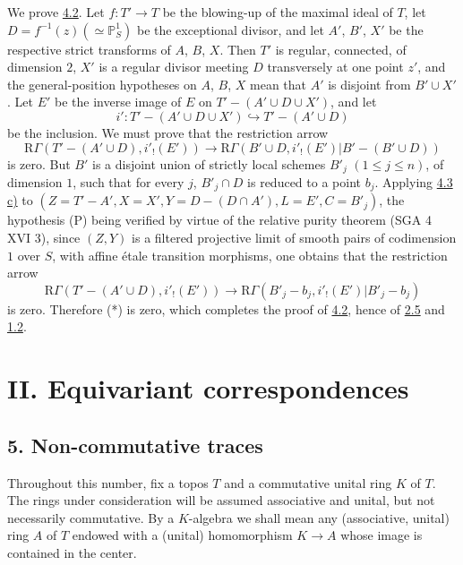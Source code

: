 \documentclass[11pt]{article}
\begin{document}
We prove \hyperref[sga5:IIIB:proposition:4.2]{4.2}. Let $f:T'\to T$ be the blowing-up of the maximal ideal of $T$, let $D=f^{-1}(z)(\simeq\mathbb P^1_S)$ be the exceptional divisor, and let $A'$, $B'$, $X'$ be the respective strict transforms of $A$, $B$, $X$. Then $T'$ is regular, connected, of dimension $2$, $X'$ is a regular divisor meeting $D$ transversely at one point $z'$, and the general-position hypotheses on $A$, $B$, $X$ mean that $A'$ is disjoint from $B'\cup X'$. Let $E'$ be the inverse image of $E$ on $T'-(A'\cup D\cup X')$, and let
\[
i':T'-(A'\cup D\cup X')\hookrightarrow T'-(A'\cup D)
\]
be the inclusion. We must prove that the restriction arrow
\begin{equation}
\mathrm R\Gamma(T'-(A'\cup D),i'_!(E'))
\longrightarrow
\mathrm R\Gamma(B'\cup D,i'_!(E')|B'-(B'\cup D))
\tag{*}\label{sga5:IIIB:equation:unnumbered:4}
\end{equation}
is zero. But $B'$ is a disjoint union of strictly local schemes $B'_j$ $(1\le j\le n)$, of dimension $1$, such that for every $j$, $B'_j\cap D$ is reduced to a point $b_j$. Applying \hyperref[sga5:IIIB:lemma:4.3]{4.3 c)} to $(Z=T'-A', X=X', Y=D-(D\cap A'), L=E', C=B'_j)$, the hypothesis (P) being verified by virtue of the relative purity theorem (SGA 4 XVI 3), since $(Z,Y)$ is a filtered projective limit of smooth pairs of codimension $1$ over $S$, with affine étale transition morphisms, one obtains that the restriction arrow
\[
\mathrm R\Gamma(T'-(A'\cup D),i'_!(E'))
\longrightarrow
\mathrm R\Gamma(B'_j-b_j,i'_!(E')|B'_j-b_j)
\]
is zero. Therefore (*) is zero, which completes the proof of \hyperref[sga5:IIIB:proposition:4.2]{4.2}, hence of \hyperref[sga5:IIIB:proposition:2.5]{2.5} and \hyperref[sga5:IIIB:theorem:1.2]{1.2}.

\section*{II. Equivariant correspondences}

\subsection*{5. Non-commutative traces}\label{sga5:IIIB:subsection:5}

Throughout this number, fix a topos $T$ and a commutative unital ring $K$ of $T$. The rings under consideration will be assumed associative and unital, but not necessarily commutative. By a $K$-algebra we shall mean any (associative, unital) ring $A$ of $T$ endowed with a (unital) homomorphism $K\to A$ whose image is contained in the center.
\end{document}
